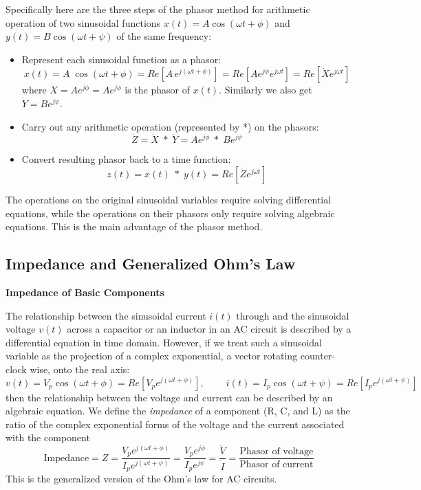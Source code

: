 \documentclass{article}
\begin{document}
Specifically here are the three steps of the phasor method for arithmetic 
operation of two sinusoidal functions $x(t)=A\cos(\omega t+\phi)$ and 
$y(t)=B\cos(\omega t+\psi)$ of the same frequency:
\begin{itemize}
\item Represent each sinusoidal function as a phasor:
  \begin{equation}
    x(t)=A\;\cos(\omega t+\phi)=Re[A\,e^{j(\omega t+\phi)}]
    =Re[A e^{j\phi} e^{j\omega t}] =Re[\dot{X} e^{j\omega t}] 
  \end{equation}
  where $\dot{X}=A e^{j\phi}=A e^{j\phi}$ is the phasor of $x(t)$. 
  Similarly we also get $\dot{Y}=B e^{j\psi}$.
\item Carry out any arithmetic operation (represented by *) on the phasors:
  \begin{equation} 
    \dot{Z}=\dot{X}\;*\;\dot{Y}=A e^{j\phi} \;*\; B e^{j\psi} 
  \end{equation}
\item Convert resulting phasor back to a time function:
  \begin{equation}
    z(t)=x(t)\;*\;y(t)=Re[\dot{Z} e^{j\omega t}]  
  \end{equation}
\end{itemize}


The operations on the original sinusoidal variables require solving 
differential equations, while the operations on their phasors only require 
solving algebraic equations. This is the main advantage of the phasor method.



\subsection{Impedance and Generalized Ohm's Law}

{\bf Impedance of Basic Components}

The relationship between the sinusoidal current $i(t)$ through and 
the sinusoidal voltage $v(t)$ across a capacitor or an inductor in 
an AC circuit is described by a differential equation in time domain.
However, if we treat such a sinusoidal variable as the projection of 
a complex exponential, a vector rotating counter-clock wise, onto the 
real axis:
\begin{equation}
  v(t)=V_p\cos(\omega t+\phi)=Re[ V_p e^{j(\omega t+\phi)} ],
  \;\;\;\;\;\;\;\;
  i(t)=I_p\cos(\omega t+\psi)=Re[ I_p e^{j(\omega t+\psi)} ]
\end{equation}
then the relationship between the voltage and current can be 
described by an algebraic equation. We define the {\em impedance} 
of a component (R, C, and L) as the ratio of the complex exponential
forms of the voltage and the current associated with the component
\begin{equation}
  \mbox{Impedance}=Z=\frac{V_pe^{j(\omega t+\phi)}}{I_pe^{j(\omega t+\psi)}}
  =\frac{V_pe^{j\phi}}{I_pe^{j\psi}}=\frac{\dot{V}}{\dot{I}}
  =\frac{\mbox{Phasor of voltage}}{\mbox{Phasor of current}}
\end{equation}
This is the generalized version of the Ohm's law for AC circuits.
\end{document}

